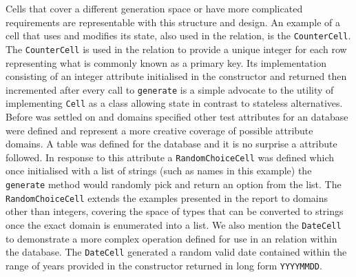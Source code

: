 Cells that cover a different generation space or have more complicated
requirements are representable with this structure and design. An
example of a cell that uses and modifies its state, also used in the
 relation, is the \lstinline{CounterCell}. The
\lstinline{CounterCell} is used in the  relation to provide
a unique integer for each row representing what is commonly known as a primary
key. Its implementation consisting of an integer
attribute initialised in the constructor and returned then incremented after
every call to \lstinline{generate} is a simple advocate to the utility of implementing
\lstinline{Cell} as a class allowing state in contrast to stateless alternatives. Before
 was settled on and domains specified other test attributes
for an  database were defined and represent a more creative
coverage of possible attribute domains. A  table was defined
for the  database and it is no surprise a
 attribute followed. In response to this attribute
a \lstinline{RandomChoiceCell} was defined which once initialised with a list
of strings (such as names in this example) the \lstinline{generate} method
would randomly pick and return an option from the list. The
\lstinline{RandomChoiceCell} extends the examples presented in the report to
domains other than integers, covering the space of types that can be converted
to strings once the exact domain is enumerated into a list. We also mention the
\lstinline{DateCell} to
demonstrate a more complex operation defined
for use in an  relation within the 
database. The \lstinline{DateCell} generated a random valid date contained within the range of
years provided in the constructor returned in long form \verb|YYYYMMDD|.

